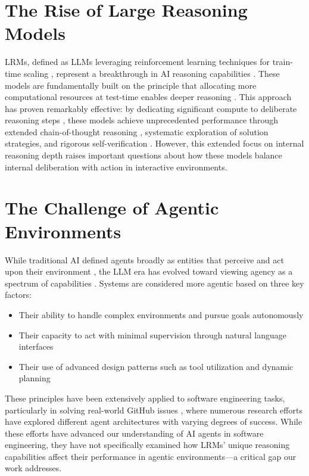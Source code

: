 \section{The Rise of Large Reasoning Models}
LRMs, defined as LLMs leveraging reinforcement learning techniques for train-time scaling \cite{xu2025largereasoningmodelssurvey}, represent a breakthrough in AI reasoning capabilities \cite{deepseekai2025deepseekr1incentivizingreasoningcapability,openai_o1}. These models are fundamentally built on the principle that allocating more computational resources at test-time enables deeper reasoning \cite{openai_learning_to_reason_2024}. This approach has proven remarkably effective: by dedicating significant compute to deliberate reasoning steps \cite{snell2024scalingllmtesttimecompute}, these models achieve unprecedented performance through extended chain-of-thought reasoning \cite{wei2023chainofthoughtpromptingelicitsreasoning}, systematic exploration of solution strategies, and rigorous self-verification \cite{madaan2023selfrefineiterativerefinementselffeedback}. However, this extended focus on internal reasoning depth raises important questions about how these models balance internal deliberation with action in interactive environments.

\section{The Challenge of Agentic Environments}
While traditional AI defined agents broadly as entities that perceive and act upon their environment \cite{russell1995ai}, the LLM era has evolved toward viewing agency as a spectrum of capabilities \cite{zhang2024agenticinformationretrieval, kapoor2024aiagentsmatter}. Systems are considered more agentic based on three key factors:
\begin{itemize}
    \item Their ability to handle complex environments and pursue goals autonomously
    \item Their capacity to act with minimal supervision through natural language interfaces
    \item Their use of advanced design patterns such as tool utilization and dynamic planning
\end{itemize}

These principles have been extensively applied to software engineering tasks, particularly in solving real-world GitHub issues \cite{jimenez2024swebenchlanguagemodelsresolve}, where numerous research efforts have explored different agent architectures \cite{ibm_swe_agents, aws_q_developer_agent, liu2024marscodeagentainativeautomated, chen2024coderissueresolvingmultiagent, wang2024executablecodeactionselicit} with varying degrees of success. While these efforts have advanced our understanding of AI agents in software engineering, they have not specifically examined how LRMs' unique reasoning capabilities affect their performance in agentic environments—a critical gap our work addresses.

